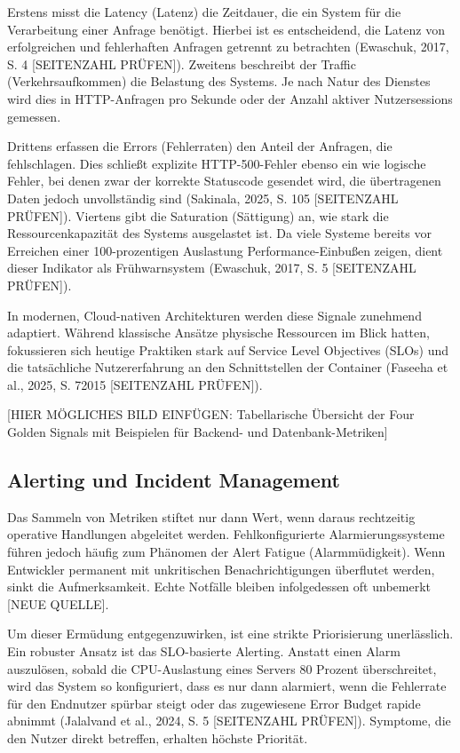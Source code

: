 Erstens misst die Latency (Latenz) die Zeitdauer, die ein System für die Verarbeitung einer Anfrage benötigt. Hierbei ist es entscheidend, die Latenz von erfolgreichen und fehlerhaften Anfragen getrennt zu betrachten (Ewaschuk, 2017, S. 4 [SEITENZAHL PRÜFEN]). Zweitens beschreibt der Traffic (Verkehrsaufkommen) die Belastung des Systems. Je nach Natur des Dienstes wird dies in HTTP-Anfragen pro Sekunde oder der Anzahl aktiver Nutzersessions gemessen.

Drittens erfassen die Errors (Fehlerraten) den Anteil der Anfragen, die fehlschlagen. Dies schließt explizite HTTP-500-Fehler ebenso ein wie logische Fehler, bei denen zwar der korrekte Statuscode gesendet wird, die übertragenen Daten jedoch unvollständig sind (Sakinala, 2025, S. 105 [SEITENZAHL PRÜFEN]). Viertens gibt die Saturation (Sättigung) an, wie stark die Ressourcenkapazität des Systems ausgelastet ist. Da viele Systeme bereits vor Erreichen einer 100-prozentigen Auslastung Performance-Einbußen zeigen, dient dieser Indikator als Frühwarnsystem (Ewaschuk, 2017, S. 5 [SEITENZAHL PRÜFEN]).

In modernen, Cloud-nativen Architekturen werden diese Signale zunehmend adaptiert. Während klassische Ansätze physische Ressourcen im Blick hatten, fokussieren sich heutige Praktiken stark auf Service Level Objectives (SLOs) und die tatsächliche Nutzererfahrung an den Schnittstellen der Container (Faseeha et al., 2025, S. 72015 [SEITENZAHL PRÜFEN]).

[HIER MÖGLICHES BILD EINFÜGEN: Tabellarische Übersicht der Four Golden Signals mit Beispielen für Backend- und Datenbank-Metriken]

\subsection{Alerting und Incident Management}

Das Sammeln von Metriken stiftet nur dann Wert, wenn daraus rechtzeitig operative Handlungen abgeleitet werden. Fehlkonfigurierte Alarmierungssysteme führen jedoch häufig zum Phänomen der Alert Fatigue (Alarmmüdigkeit). Wenn Entwickler permanent mit unkritischen Benachrichtigungen überflutet werden, sinkt die Aufmerksamkeit. Echte Notfälle bleiben infolgedessen oft unbemerkt [NEUE QUELLE].

Um dieser Ermüdung entgegenzuwirken, ist eine strikte Priorisierung unerlässlich. Ein robuster Ansatz ist das SLO-basierte Alerting. Anstatt einen Alarm auszulösen, sobald die CPU-Auslastung eines Servers 80 Prozent überschreitet, wird das System so konfiguriert, dass es nur dann alarmiert, wenn die Fehlerrate für den Endnutzer spürbar steigt oder das zugewiesene Error Budget rapide abnimmt (Jalalvand et al., 2024, S. 5 [SEITENZAHL PRÜFEN]). Symptome, die den Nutzer direkt betreffen, erhalten höchste Priorität.

